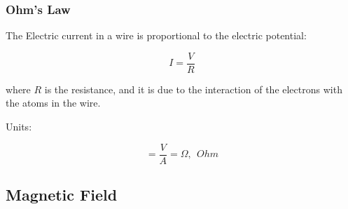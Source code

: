 \documentclass[]{beamer}
\begin{document}
\begin{frame}
\frametitle{Ohm's Law}

The Electric current in a wire is proportional to the  electric potential:
\pause
\vspace{3mm}

\begin{equation}
I=\frac{V}{R}
\end{equation}

\pause
\vspace{3mm}

where $R$ is the resistance, and it is due to the interaction of the electrons with the atoms in the wire.

\pause
\vspace{3mm}

Units:


\begin{equation}
[R]=\frac{V}{A}=\Omega,\ \ Ohm  
\end{equation}

  \end{frame}



\subsection{Magnetic Field}
\end{document}
